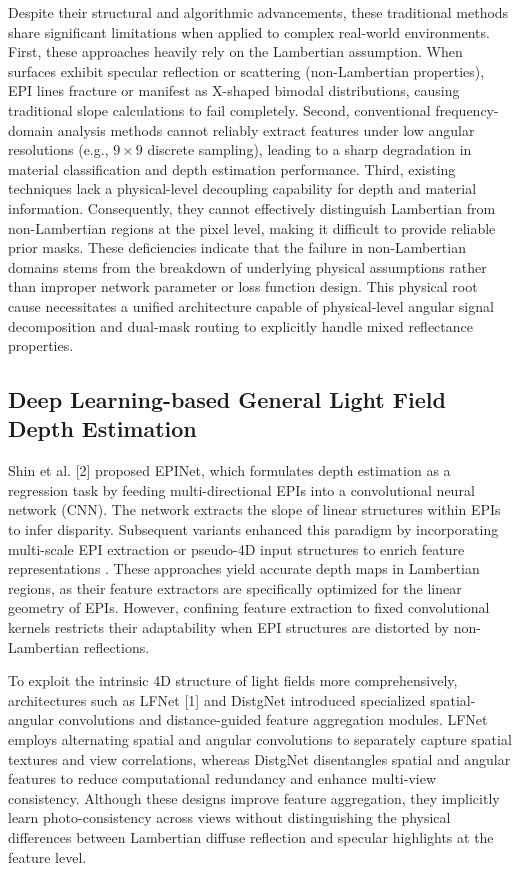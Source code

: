 Despite their structural and algorithmic advancements, these traditional methods share significant limitations when applied to complex real-world environments. First, these approaches heavily rely on the Lambertian assumption. When surfaces exhibit specular reflection or scattering (non-Lambertian properties), EPI lines fracture or manifest as X-shaped bimodal distributions, causing traditional slope calculations to fail completely. Second, conventional frequency-domain analysis methods cannot reliably extract features under low angular resolutions (e.g., $9 \times 9$ discrete sampling), leading to a sharp degradation in material classification and depth estimation performance. Third, existing techniques lack a physical-level decoupling capability for depth and material information. Consequently, they cannot effectively distinguish Lambertian from non-Lambertian regions at the pixel level, making it difficult to provide reliable prior masks. These deficiencies indicate that the failure in non-Lambertian domains stems from the breakdown of underlying physical assumptions rather than improper network parameter or loss function design. This physical root cause necessitates a unified architecture capable of physical-level angular signal decomposition and dual-mask routing to explicitly handle mixed reflectance properties.

\subsection{Deep Learning-based General Light Field Depth Estimation}

Shin et al. [2] proposed EPINet, which formulates depth estimation as a regression task by feeding multi-directional EPIs into a convolutional neural network (CNN). The network extracts the slope of linear structures within EPIs to infer disparity. Subsequent variants enhanced this paradigm by incorporating multi-scale EPI extraction or pseudo-4D input structures to enrich feature representations . These approaches yield accurate depth maps in Lambertian regions, as their feature extractors are specifically optimized for the linear geometry of EPIs. However, confining feature extraction to fixed convolutional kernels restricts their adaptability when EPI structures are distorted by non-Lambertian reflections.

To exploit the intrinsic 4D structure of light fields more comprehensively, architectures such as LFNet [1] and DistgNet introduced specialized spatial-angular convolutions and distance-guided feature aggregation modules. LFNet employs alternating spatial and angular convolutions to separately capture spatial textures and view correlations, whereas DistgNet disentangles spatial and angular features to reduce computational redundancy and enhance multi-view consistency. Although these designs improve feature aggregation, they implicitly learn photo-consistency across views without distinguishing the physical differences between Lambertian diffuse reflection and specular highlights at the feature level.

